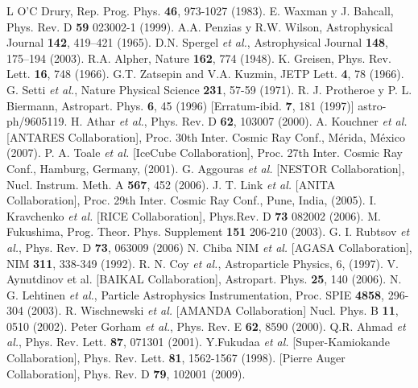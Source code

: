 \begin{thebibliography}{1}
 L O'C Drury, Rep. Prog. Phys. \textbf{46}, 973-1027 (1983).
 E. Waxman y J. Bahcall, Phys. Rev. D \textbf{59} 023002-1 (1999).
 A.A. Penzias y R.W. Wilson, Astrophysical Journal \textbf{142}, 419–421 (1965).
 D.N. Spergel {\it et al.}, Astrophysical Journal \textbf{148}, 175–194 (2003). 
 R.A. Alpher, Nature \textbf{162}, 774 (1948).  
 K. Greisen, Phys. Rev. Lett. \textbf{16}, 748 (1966).
 G.T. Zatsepin and V.A. Kuzmin, JETP Lett. \textbf{4}, 78 (1966).
 G. Setti {\it et al.}, Nature Physical Science \textbf{231}, 57-59 (1971).
 R. J. Protheroe y P. L. Biermann, Astropart. Phys. \textbf{6}, 45 (1996) [Erratum-ibid. \textbf{7}, 181 (1997)] astro-ph/9605119.
 H. Athar {\it et al.}, Phys. Rev. D \textbf{62}, 103007 (2000).
 A. Kouchner {\it et al.} [ANTARES Collaboration], Proc. 30th Inter. Cosmic Ray Conf., Mérida, México (2007).
 P. A. Toale {\it et al.} [IceCube Collaboration], Proc. 27th Inter. Cosmic Ray Conf., Hamburg, Germany, (2001).
 G. Aggouras {\it et al.} [NESTOR Collaboration], Nucl. Instrum. Meth. A \textbf{567}, 452 (2006).
 J. T. Link {\it et al.} [ANITA Collaboration], Proc. 29th Inter. Cosmic Ray Conf., Pune, India, (2005).
 I. Kravchenko {\it et al.} [RICE Collaboration], Phys.Rev. D \textbf{73} 082002 (2006).
 M. Fukushima, Prog. Theor. Phys. Supplement \textbf{151} 206-210 (2003). 
 G. I. Rubtsov {\it et al.}, Phys. Rev. D \textbf{73}, 063009 (2006)
 N. Chiba NIM {\it et al.} [AGASA Collaboration], NIM \textbf{311}, 338-349 (1992).
 R. N. Coy {\it et al.}, Astroparticle Physics, 6, (1997).
 V. Aynutdinov et al. [BAIKAL Collaboration], Astropart. Phys. \textbf{25}, 140 (2006).
 N. G. Lehtinen {\it et al.}, Particle Astrophysics Instrumentation, Proc. SPIE \textbf{4858}, 296-304 (2003).
 R. Wischnewski {\it et al.} [AMANDA Collaboration] Nucl. Phys. B \textbf{11}, 0510 (2002).
 Peter Gorham {\it et al.}, Phys. Rev. E \textbf{62}, 8590 (2000).
 Q.R. Ahmad {\it et al.}, Phys. Rev. Lett. \textbf{87}, 071301 (2001).
 Y.Fukudaa {\it et al.} [Super-Kamiokande Collaboration], Phys. Rev. Lett. \textbf{81}, 1562-1567 (1998).
 [Pierre Auger Collaboration], Phys. Rev. D \textbf{79}, 102001 (2009).

\end{thebibliography}
